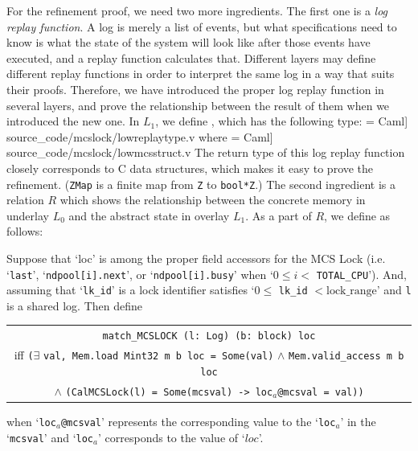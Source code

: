 For the refinement proof, we need two more ingredients.
The first one is a \emph{log replay function}.
A log is merely a list of events, but what specifications need to know is what the state of the system will look like after those events have executed,
and a replay function calculates that. 
Different layers may define different replay functions in order to interpret the same log in a way that suits their proofs.
Therefore, we have introduced the proper log replay function in several layers, and prove the relationship between the result of them when we introduced the new one.
In $L_1$, we define , which has the following type:
 = Caml] {source_code/mcslock/lowreplaytype.v}
where
 = Caml] {source_code/mcslock/lowmcsstruct.v}
The return type of this log replay function closely corresponds to C data structures, which makes it easy to prove the refinement. (\lstinline$ZMap$ is a finite map from \lstinline$Z$ to \lstinline$bool*Z$.)
The second ingredient is a relation $R$ which shows the relationship between the concrete memory in underlay $L_0$ and the abstract state in overlay $L_1$.
As a part of $R$, we define  as follows:


\begin{definition}
Suppose that `loc' is among the proper field accessors for the MCS Lock (i.e. `\lstinline$last$', `\lstinline$ndpool[i].next$', or  `\lstinline$ndpool[i].busy$' when `$0 \leq i <$  \lstinline$TOTAL_CPU$'). And, assuming that `\lstinline$lk_id$' is a lock identifier satisfies `$0 \leq$ \lstinline$lk_id$ $< \mathrm{lock\_range}$' and \lstinline$l$ is a shared log. Then define 

\begin{center}
  \begin{tabular}{c}
    \lstinline$match_MCSLOCK (l: Log) (b: block) loc$\\
iff \lstinline$($$\exists$ \lstinline$val, Mem.load Mint32 m b loc = Some(val)$ $\wedge$  \lstinline$Mem.valid_access m b loc$\\
$\wedge$ \lstinline$(CalMCSLock(l) = Some(mcsval) -> loc$$_{a}$\lstinline$@mcsval = val))$
\end{tabular}

\end{center}
when `\lstinline$loc$$_{a}$\lstinline$@mcsval$' represents the corresponding 
value to the `\lstinline$loc$$_{a}$' in the `\lstinline$mcsval$' 
and `\lstinline$loc$$_{a}$' corresponds to the value of `$loc$'.
\end{definition}

